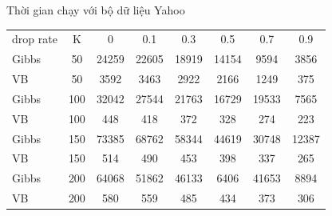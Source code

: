 \documentclass[pdf]{beamer}
\begin{document}
\begin{frame}{Thời gian chạy với bộ dữ liệu Yahoo}
\begin{tabular}{l|c |c | c | c | c | c | c }
	drop rate & K & 0  & 0.1 & 0.3 & 0.5 & 0.7 & 0.9 \\
	\arrayrulecolor{blue}\hline \hline
	\arrayrulecolor{black}
	Gibbs &50 & 24259& 22605 & 18919 & 14154 & 9594 & 3856 \\ 
	VB &50 & 3592& 3463 & 2922 & 2166 &1249 & 375 \\
	\arrayrulecolor{blue}\hline \hline
	\arrayrulecolor{black}
	Gibbs &100 &32042 & 27544 & 21763 & 16729 & 19533&  7565\\ 
	VB &100 &448 & 418 & 372 & 328 &274 &223\\
	\arrayrulecolor{blue}\hline \hline
	\arrayrulecolor{black}
	Gibbs &150 &73385 & 68762 & 58344 & 44619 & 30748& 12387 \\ 
	VB &150 &514 & 490 & 453 & 398 &337 &265\\
	\arrayrulecolor{blue}\hline \hline
	\arrayrulecolor{black}
	Gibbs &200 & 64068& 51862 & 46133 & 6406 & 41653 & 8894 \\ 
	VB &200 &580 & 559 & 485 & 434 & 373 &306
\end{tabular}
\end{frame}
\end{document}
